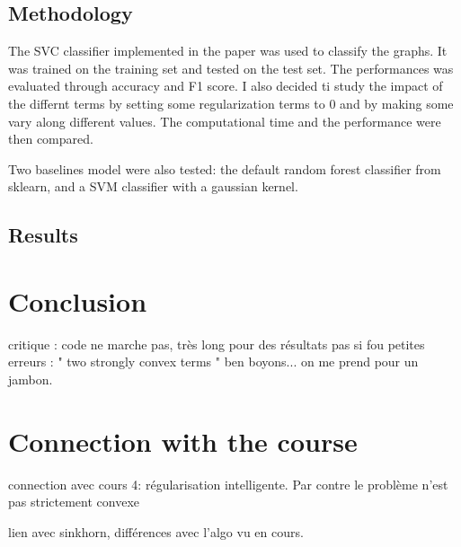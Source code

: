 \documentclass[a4paper,11pt]{article}
\begin{document}
\subsection{Methodology}

The SVC classifier implemented in the paper was used to classify the graphs. 
It was trained on the training set and tested on the test set.
The performances was evaluated through accuracy and F1 score.
I also decided ti study the impact of the differnt terms by setting some regularization terms to 0 and by making some vary along different values. 
The computational time and the performance were then compared. 

Two baselines model were also tested: the default random forest classifier from sklearn, and a SVM classifier with a gaussian kernel.





\subsection{Results}

\section{Conclusion}

critique : code ne marche pas, très long pour des résultats pas si fou 
petites erreurs : " two strongly convex terms " ben boyons... on me prend pour un jambon.

\section{Connection with the course}

connection avec cours 4: régularisation intelligente. 
Par contre le problème n'est pas strictement convexe

lien avec sinkhorn, différences avec l'algo vu en cours. 

\printbibliography
\end{document}
